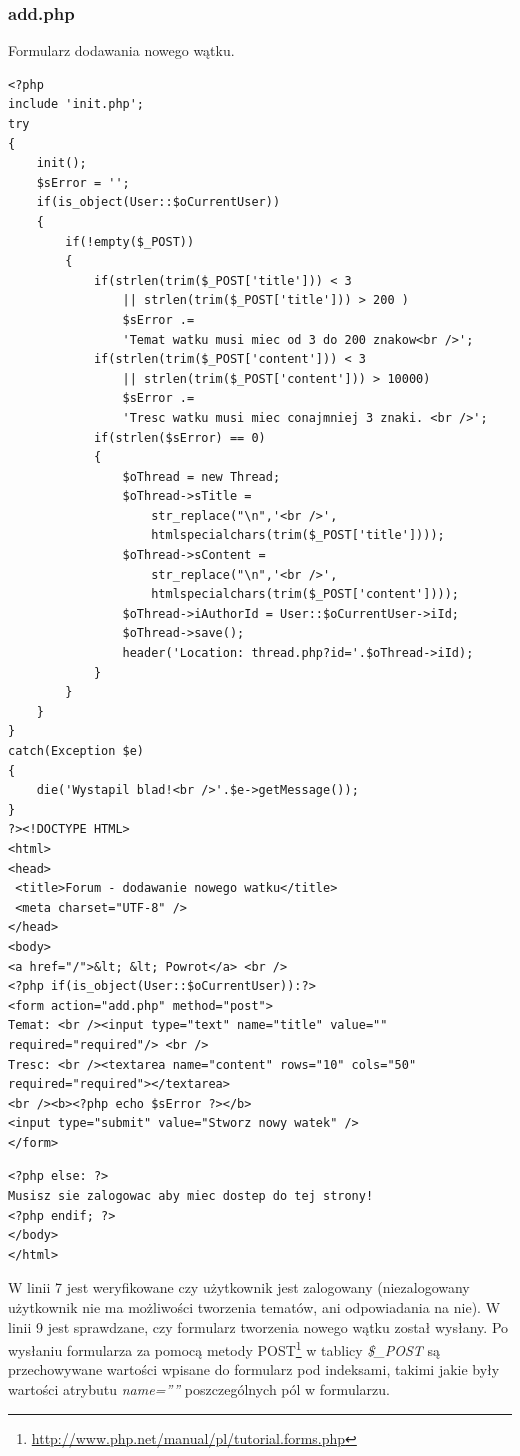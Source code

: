 \documentclass[a4paper,10pt]{article}
\begin{document}
{\subsubsection{add.php}
Formularz dodawania nowego wątku.\\
\begin{verbatim}
<?php
include 'init.php';
try
{
	init();
	$sError = '';
	if(is_object(User::$oCurrentUser))
	{
		if(!empty($_POST))
		{
			if(strlen(trim($_POST['title'])) < 3
				|| strlen(trim($_POST['title'])) > 200 )
				$sError .= 
				'Temat watku musi miec od 3 do 200 znakow<br />';
			if(strlen(trim($_POST['content'])) < 3
				|| strlen(trim($_POST['content'])) > 10000)
				$sError .=
				'Tresc watku musi miec conajmniej 3 znaki. <br />';
			if(strlen($sError) == 0)
			{
				$oThread = new Thread;
				$oThread->sTitle =
					str_replace("\n",'<br />',
					htmlspecialchars(trim($_POST['title'])));
				$oThread->sContent =
					str_replace("\n",'<br />',
					htmlspecialchars(trim($_POST['content'])));
				$oThread->iAuthorId = User::$oCurrentUser->iId;
				$oThread->save();
				header('Location: thread.php?id='.$oThread->iId);
			}
		}
	}
}
catch(Exception $e)
{
	die('Wystapil blad!<br />'.$e->getMessage());
}
?><!DOCTYPE HTML>
<html>
<head>
 <title>Forum - dodawanie nowego watku</title>
 <meta charset="UTF-8" />
</head>
<body>
<a href="/">&lt; &lt; Powrot</a> <br />
<?php if(is_object(User::$oCurrentUser)):?>
<form action="add.php" method="post">
Temat: <br /><input type="text" name="title" value="" required="required"/> <br />
Tresc: <br /><textarea name="content" rows="10" cols="50" required="required"></textarea>
<br /><b><?php echo $sError ?></b>
<input type="submit" value="Stworz nowy watek" />
</form>
\end{verbatim}
\begin{verbatim}
<?php else: ?>
Musisz sie zalogowac aby miec dostep do tej strony!
<?php endif; ?>
</body>
</html>
\end{verbatim}
W linii 7 jest weryfikowane czy użytkownik jest zalogowany (niezalogowany użytkownik nie ma możliwości tworzenia tematów, ani odpowiadania na nie). W linii 9 jest sprawdzane, czy formularz tworzenia nowego wątku został wysłany. Po wysłaniu formularza za pomocą metody POST\footnote{\href{http://www.php.net/manual/pl/tutorial.forms.php}{http://www.php.net/manual/pl/tutorial.forms.php}} w tablicy \textit{\$\_POST} są przechowywane wartości wpisane do formularz pod indeksami, takimi jakie były wartości atrybutu \textit{name=''''} poszczególnych pól w formularzu.\\
}
\end{document}
